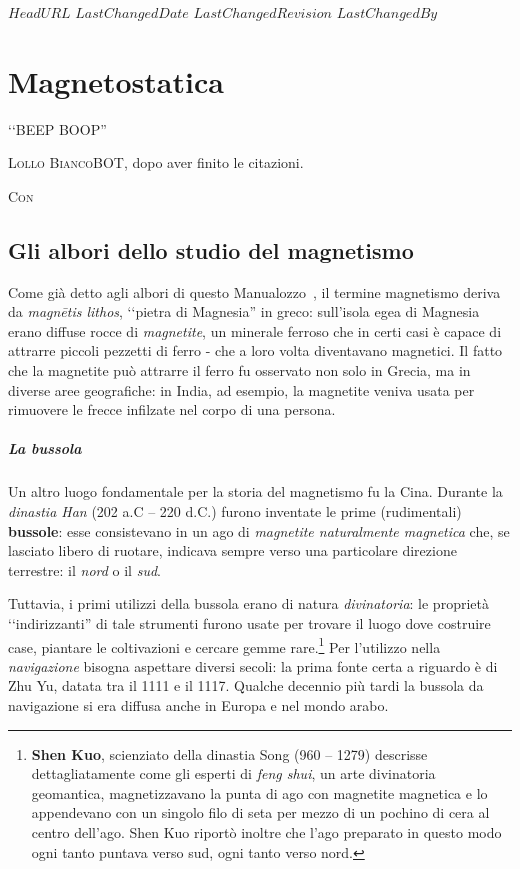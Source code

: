 \svnidlong
{$HeadURL$}
{$LastChangedDate$}
{$LastChangedRevision$}
{$LastChangedBy$}

\chapter{Magnetostatica}

\begin{introduction}
	‘‘BEEP BOOP''
	\begin{flushright}
		\textsc{Lollo BiancoBOT}, dopo aver finito le citazioni. %
	\end{flushright}
\end{introduction}
\lettrine[findent=1pt, nindent=0pt]{C}{on}
\section{Gli albori dello studio del magnetismo}
Come già detto agli albori di questo Manualozzo\texttrademark\ , il termine magnetismo deriva da \textit{magnētis lithos}, ‘‘pietra di Magnesia'' in greco: sull'isola egea di Magnesia erano diffuse rocce di \textit{magnetite}, un minerale ferroso che in certi casi è capace di attrarre piccoli pezzetti di ferro - che a loro volta diventavano magnetici.
Il fatto che la magnetite può attrarre il ferro fu osservato non solo in Grecia, ma in diverse aree geografiche: in India, ad esempio, la magnetite veniva usata per rimuovere le frecce infilzate nel corpo di una persona.
\paragraph{La bussola}
Un altro luogo fondamentale per la storia del magnetismo fu la Cina. Durante la \textit{dinastia Han} (202 a.C – 220 d.C.) furono inventate le prime (rudimentali) \textbf{bussole}: esse consistevano in un ago di \textit{magnetite naturalmente magnetica} che, se lasciato libero di ruotare, indicava sempre verso una particolare direzione terrestre: il \textit{nord} o il \textit{sud}.

Tuttavia, i primi utilizzi della bussola erano di natura \textit{divinatoria}: le proprietà ‘‘indirizzanti'' di tale strumenti furono usate per trovare il luogo dove costruire case, piantare le coltivazioni e cercare gemme rare.\footnote{\textbf{Shen Kuo}, scienziato della dinastia Song (960 – 1279) descrisse dettagliatamente come gli esperti di \textit{feng shui}, un arte divinatoria geomantica, magnetizzavano la punta di ago con magnetite magnetica e lo appendevano con un singolo filo di seta per mezzo di un pochino di cera al centro dell'ago. Shen Kuo riportò inoltre che l'ago preparato in questo modo ogni tanto puntava verso sud, ogni tanto verso nord.} Per l'utilizzo nella \textit{navigazione} bisogna aspettare diversi secoli: la prima fonte certa a riguardo è di Zhu Yu, datata tra il 1111 e il 1117. Qualche decennio più tardi la bussola da navigazione si era diffusa anche in Europa e nel mondo arabo.

